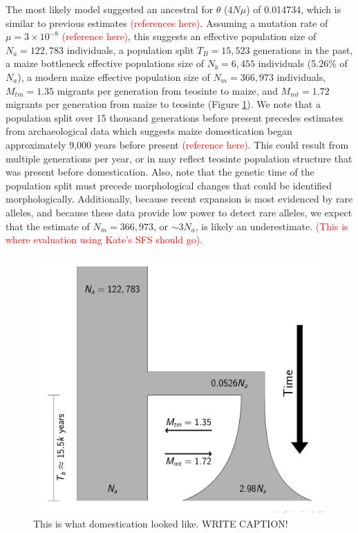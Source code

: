 \documentclass{pnastwo}
\begin{document}
\begin{article}
The most likely model suggested an ancestral for $\theta$ ($4N\mu$) of
0.014734, which is similar to previous estimates
\textcolor{red}{(references here)}. Assuming a mutation rate of $\mu =
3 \times 10^{-8}$ \textcolor{red}{(reference here)}, this suggests an effective
population size of $N_a = 122,783$ individuals, a population split
$T_B = 15,523$ generations in the past, a maize bottleneck
effective populations size of $N_b = 6,455$ individuals (5.26\% of
$N_a$), a modern maize effective population size of $N_m = 366,973$
individuals, $M_{tm} = 1.35$ migrants per generation from teosinte to
maize, and $M_{mt} = 1.72$ migrants per generation from maize to
teosinte (Figure \ref{bottleneck}). We note that a population
split over 15 thousand generations before present precedes estimates
from
archaeological data which suggests maize domestication began
approximately 9,000 years before present \textcolor{red}{(reference
  here)}. This could result from multiple generations per year, or in
may reflect teosinte population structure that was present before
domestication. Also, note that the genetic time of the population
split must precede morphological changes that could be identified
morphologically.   Additionally, because recent expansion is
most evidenced by rare alleles, and because these data provide low
power to detect rare alleles, we expect that the estimate of  $N_m =
366,973$, or $\sim 3N_a$, is likely an underestimate. \textcolor{red}{(This
  is where evaluation using Kate's SFS should go)}.


\begin{figure}[b]
\centering
\includegraphics[width=.5\textwidth]{FigsAndFiles/DomesticationModel/domesticationModel.pdf}
\caption{This is what domestication looked like. WRITE CAPTION!}
\label{bottleneck}
\end{figure}



\end{article}
\end{document}
